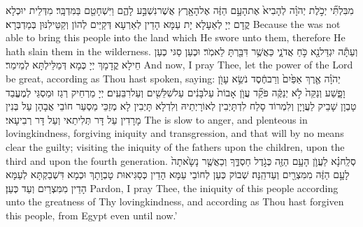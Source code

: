 {מִבִּלְתִּ֞י יְכֹ֣לֶת יְהֹוָ֗ה לְהָבִיא֙ אֶת\maqqaf הָעָ֣ם הַזֶּ֔ה אֶל\maqqaf הָאָ֖רֶץ אֲשֶׁר\maqqaf נִשְׁבַּ֣ע לָהֶ֑ם וַיִּשְׁחָטֵ֖ם בַּמִּדְבָּֽר׃}
{מִדְּלֵית יוּכְלָא קֳדָם יְיָ לְאַעָלָא יָת עַמָּא הָדֵין לְאַרְעָא דְּקַיֵּים לְהוֹן וְקַטֵּילִנּוּן בְּמַדְבְּרָא׃}
{Because the \lord\space was not able to bring this people into the land which He swore unto them, therefore He hath slain them in the wilderness.}{}
{וְעַתָּ֕ה \large יִ\normalsize גְדַּל\maqqaf נָ֖א כֹּ֣חַ אֲדֹנָ֑י כַּאֲשֶׁ֥ר דִּבַּ֖רְתָּ לֵאמֹֽר׃}
{וּכְעַן סַגּי כְעַן חֵילָא קֳדָמָךְ יְיָ כְּמָא דְּמַלֵּילְתָּא לְמֵימַר׃}
{And now, I pray Thee, let the power of the Lord be great, according as Thou hast spoken, saying:}{}
{יְהֹוָ֗ה אֶ֤רֶךְ אַפַּ֙יִם֙ וְרַב\maqqaf חֶ֔סֶד נֹשֵׂ֥א עָוֺ֖ן וָפָ֑שַׁע וְנַקֵּה֙ לֹ֣א יְנַקֶּ֔ה פֹּקֵ֞ד עֲוֺ֤ן אָבוֹת֙ עַל\maqqaf בָּנִ֔ים עַל\maqqaf שִׁלֵּשִׁ֖ים וְעַל\maqqaf רִבֵּעִֽים׃}
{יְיָ מַרְחֵיק רְגַז וּמַסְגֵּי לְמֶעֱבַד טָבְוָן שָׁבֵיק לַעֲוָיָן וְלִמְרוֹד סָלַח לִדְתָּיְבִין לְאוֹרָיְתֵיהּ וְלִדְלָא תָּיְבִין לָא מְזַכֵּי מַסְעַר חוֹבֵי אֲבָהָן עַל בְּנִין מָרָדִין עַל דָּר תְּלִיתַאי וְעַל דָּר רְבִיעָאי׃}
{The \lord\space is slow to anger, and plenteous in lovingkindness, forgiving iniquity and transgression, and that will by no means clear the guilty; visiting the iniquity of the fathers upon the children, upon the third and upon the fourth generation.}{}
{סְלַֽח\maqqaf נָ֗א לַעֲוֺ֛ן הָעָ֥ם הַזֶּ֖ה כְּגֹ֣דֶל חַסְדֶּ֑ךָ וְכַאֲשֶׁ֤ר נָשָׂ֙אתָה֙ לָעָ֣ם הַזֶּ֔ה מִמִּצְרַ֖יִם וְעַד\maqqaf הֵֽנָּה׃}
{שְׁבוֹק כְּעַן לְחוֹבֵי עַמָּא הָדֵין כְּסַגִּיאוּת טָבְוָתָךְ וּכְמָא דִּשְׁבַקְתָּא לְעַמָּא הָדֵין מִמִּצְרַיִם וְעַד כְּעַן׃}
{Pardon, I pray Thee, the iniquity of this people according unto the greatness of Thy lovingkindness, and according as Thou hast forgiven this people, from Egypt even until now.’}{}
